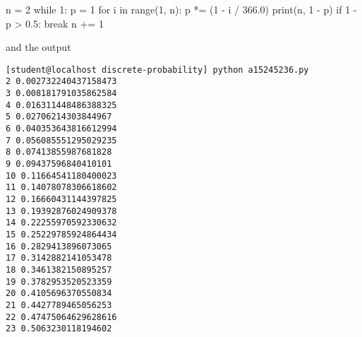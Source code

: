 {\small \begin{console}[frame=single, , commandchars=~!@]
n = 2
while 1:
    p = 1
    for i in range(1, n):
        p *= (1 - i / 366.0)
    print(n, 1 - p)
    if 1 - p > 0.5:
         break
    n += 1
\end{console}
}
and the output
{\small \begin{Verbatim}[frame=single,fontsize=\small]
[student@localhost discrete-probability] python a15245236.py
2 0.002732240437158473
3 0.008181791035862584
4 0.016311448486388325
5 0.02706214303844967
6 0.040353643816612994
7 0.056085551295029235
8 0.07413855987681828
9 0.09437596840410101
10 0.11664541180400023
11 0.14078078306618602
12 0.16660431144397825
13 0.19392876024909378
14 0.22255970592330632
15 0.25229785924864434
16 0.2829413896073065
17 0.3142882141053478
18 0.3461382150895257
19 0.3782953520523359
20 0.4105696370550834
21 0.4427789465056253
22 0.47475064629628616
23 0.5063230118194602
\end{Verbatim}
}
